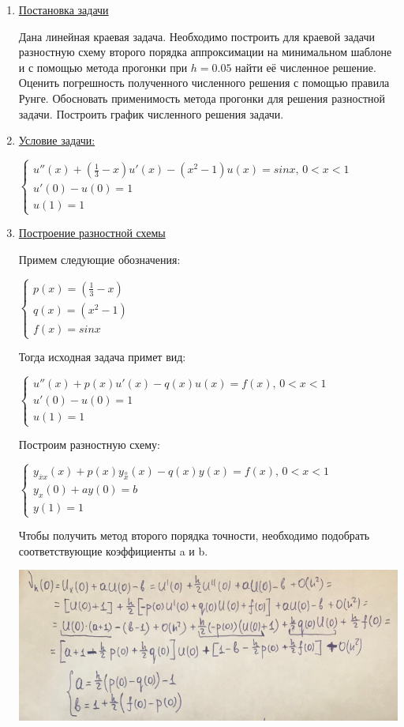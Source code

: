\documentclass{article}%
\begin{document}
\begin{enumerate}%
\item%
\underline{Постановка задачи}

Дана линейная краевая задача. 
Необходимо построить для краевой задачи разностную схему второго порядка аппроксимации на минимальном шаблоне и с помощью метода прогонки при $h = 0.05$ найти её численное решение. 
Оценить погрешность полученного численного решения с помощью правила Рунге. 
Обосновать применимость метода прогонки для решения разностной задачи. Построить график численного решения задачи.

\item%
\underline{Условие задачи:}

$\begin{cases} 
u''(x) + (\frac{1}{3} - x)u'(x) - (x^2-1)u(x)=sinx,\,  0<x<1\\ u'(0) - u(0) = 1 \\ u(1) = 1
\end{cases}$

\item%
\underline{Построение разностной схемы}

Примем следующие обозначения:

$\begin{cases} 
p(x) = (\frac{1}{3} - x) \\ q(x) = (x^2-1) \\ f(x) = sinx
\end{cases}$

Тогда исходная задача примет вид:

$\begin{cases} 
u''(x) + p(x)u'(x) - q(x)u(x)=f(x),\,  0<x<1\\ u'(0) - u(0) = 1 \\ u(1) = 1
\end{cases}$

\vskip 0.2in

Построим разностную схему:

$\begin{cases} 
y_{{\overline x}x}(x) + p(x)y_{\overset{o}{x}}(x) - q(x)y(x)=f(x),\,  0<x<1\\ y_x(0) + ay(0) = b \\ y(1) = 1
\end{cases}$

Чтобы получить метод второго порядка точности, необходимо подобрать соответствующие коэффициенты a и b.

\includegraphics[scale=0.7]{lab2_2_0.png}


\end{enumerate}
\end{document}
